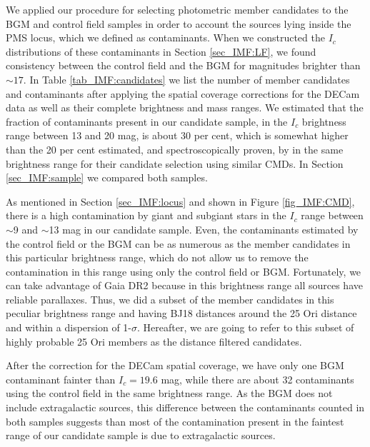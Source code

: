 \documentclass[12pt]{article}
\begin{document}
We applied our procedure for selecting photometric member candidates to the BGM and control field samples in order to account the sources lying inside the PMS locus, which we defined as contaminants. When we constructed the $I_c$ distributions of these contaminants in Section \ref{sec_IMF:LF}, we found consistency between the control field and the BGM for magnitudes brighter than $\sim 17$. In Table \ref{tab_IMF:candidates} we list the number of member candidates and contaminants after applying the spatial coverage corrections for the DECam data as well as their complete brightness and mass ranges. We estimated that the fraction of contaminants present in our candidate sample, in the $I_c$ brightness range between 13 and 20 mag, is about 30 per cent, which is somewhat higher than the 20 per cent estimated, and spectroscopically proven, by \citet{Downes2014} in the same brightness range for their candidate selection using similar CMDs. In Section \ref{sec_IMF:sample} we compared both samples. 

As mentioned in Section \ref{sec_IMF:locus} and shown in Figure \ref{fig_IMF:CMD}, there is a high contamination by giant and subgiant stars in the $I_c$ range between $\sim$9 and $\sim$13 mag in our candidate sample. Even, the contaminants estimated by the control field or the BGM can be as numerous as the member candidates in this particular brightness range, which do not allow us to remove the contamination in this range using only the control field or BGM. Fortunately, we can take advantage of Gaia DR2 because in this brightness range all sources have reliable parallaxes. Thus, we did a subset of the member candidates in this peculiar brightness range and having BJ18 distances around the 25 Ori distance and within a dispersion of 1-$\sigma$. Hereafter, we are going to refer to this subset of highly probable 25 Ori members as the distance filtered candidates.

After the correction for the DECam spatial coverage, we have only one BGM contaminant fainter than $I_c=19.6$ mag, while there are about 32 contaminants using the control field in the same brightness range. As the BGM does not include extragalactic sources, this difference between the contaminants counted in both samples suggests than most of the contamination present in the faintest range of our candidate sample is due to extragalactic sources. 
\end{document}

